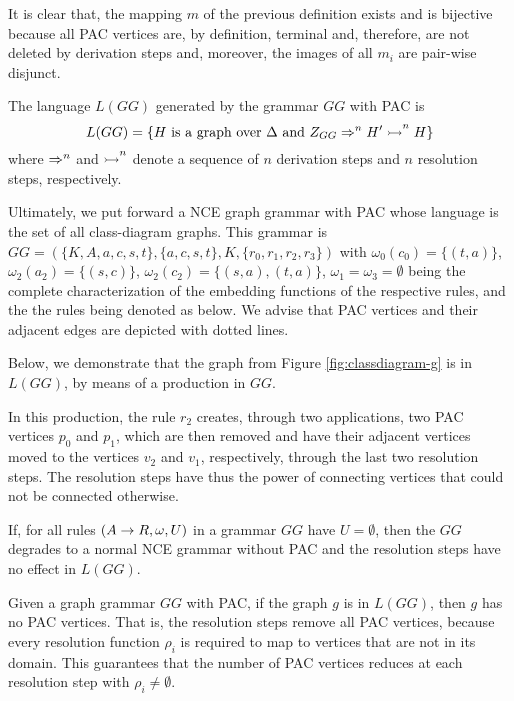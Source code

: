 It is clear that, the mapping $m$ of the previous definition exists and is bijective because all PAC vertices are, by definition, terminal and, therefore, are not deleted by derivation steps and, moreover, the images of all $m_i$ are pair-wise disjunct.

\begin{definition}
	The language $L(GG)$ generated by the grammar $GG$ with PAC is
	\begin{equation*}
		L(GG) = \{ H \text{ is a graph over } \Delta \text{ and } Z_{GG} \Rightarrow^{n}_{} H' \overset{}{\rightarrowtail}^{n} H \}
	\end{equation*}
	where $\Rightarrow^{n}_{}$ and $\overset{}{\rightarrowtail}^{n}$ denote a sequence of $n$ derivation steps and $n$ resolution steps, respectively.
\end{definition}

Ultimately, we put forward a NCE graph grammar with PAC whose language is the set of all class-diagram graphs. This grammar is $GG = (\{K, A, a, c, s, t\}, \{a, c, s, t\}, K, \{r_0, r_1, r_2, r_3\})$ with $\omega_0(c_0) = \{(t,a)\}$, $\omega_2(a_2) = \{(s,c)\}$, $\omega_2(c_2) = \{(s,a),(t,a)\}$, $\omega_1 = \omega_3 = \emptyset$ being the complete characterization of the embedding functions of the respective rules, and the the rules being denoted as below. We advise that PAC vertices and their adjacent edges are depicted with dotted lines.



Below, we demonstrate that the graph from Figure \ref{fig:classdiagram-g} is in $L(GG)$, by means of a production in $GG$.


In this production, the rule $r_2$ creates, through two applications, two PAC vertices $p_0$ and $p_1$, which are then removed and have their adjacent vertices moved to the vertices $v_2$ and $v_1$, respectively, through the last two resolution steps. The resolution steps have thus the power of connecting vertices that could not be connected otherwise.


\begin{remark}
	If, for all rules $(A \to R,\omega,U)$ in a grammar $GG$ have $U = \emptyset$, then the $GG$ degrades to a normal NCE grammar without PAC and the resolution steps have no effect in $L(GG)$.
\end{remark}

\begin{remark}
	Given a graph grammar $GG$ with PAC, if the graph $g$ is in $L(GG)$, then $g$ has no PAC vertices. That is, the resolution steps remove all PAC vertices, because every resolution function $\rho_i$ is required to map to vertices that are not in its domain. This guarantees that the number of PAC vertices reduces at each resolution step with $\rho_i \neq \emptyset$.
\end{remark}

